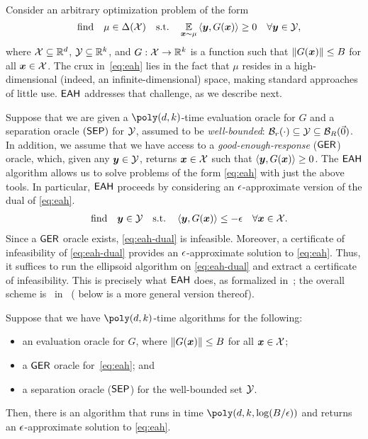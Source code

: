 Consider an arbitrary optimization problem of the form
\begin{equation}
    \label{eq:eah}
    \qq{find} \mu \in \Delta(\cX) \qq{s.t.} \E_{\vx \sim \mu} \ip{\vy, G(\vx)} \ge 0 \quad \forall \vy \in \cY,
\end{equation}
where ${\mathcal{X}} \subseteq \mathbb R^d$, ${\mathcal{Y}} \subseteq \mathbb R^k$, and $G : {\mathcal{X}} \to \mathbb R^k$ is a function such that $\| G({\bm{x}}) \| \leq B$ for all ${\bm{x}} \in {\mathcal{X}}$. The crux in~\eqref{eq:eah} lies in the fact that $\mu$ resides in a high-dimensional (indeed, an infinite-dimensional) space, making standard approaches of little use. $\textsf{EAH}$ addresses that challenge, as we describe next.

Suppose that we are given a $\poly(d, k)$-time evaluation oracle for $G$ and a separation oracle $(\textsf{SEP})$ for ${\mathcal{Y}}$, assumed to be \emph{well-bounded}: ${\mathcal{B}}_r(\cdot) \subseteq {\mathcal{Y}} \subseteq {\mathcal{B}}_R(\vec{0})$. In addition, we assume that we have access to a {\em good-enough-response} ($\textsf{GER}$) oracle, which, given any ${\bm{y}} \in {\mathcal{Y}}$, returns ${\bm{x}} \in {\mathcal{X}}$ such that $\ip{\vy, G(\vx)} \ge 0$. The $\textsf{EAH}$ algorithm allows us to solve problems of the form \eqref{eq:eah} with just the above tools. In particular, $\textsf{EAH}$ proceeds by considering an $\epsilon$-approximate version of the dual of \eqref{eq:eah}.
\begin{align} \label{eq:eah-dual}
    \qq{find} \vy \in \cY \qq{s.t.} \ip{\vy, G(\vx)} \le -\eps \quad \forall \vx \in \cX.
\end{align}
Since a $\textsf{GER}$ oracle exists, \eqref{eq:eah-dual} is infeasible. Moreover, a certificate of infeasibility of \eqref{eq:eah-dual} provides an $\epsilon$-approximate solution to \eqref{eq:eah}. Thus, it suffices to run the ellipsoid algorithm on \eqref{eq:eah-dual} and extract a certificate of infeasibility. This is precisely what $\textsf{EAH}$ does, as formalized in~; the overall scheme is~ in~ ( below is a more general version thereof).

\begin{theorem}
    \label{theorem:eah}
    Suppose that we have $\poly(d, k)$-time algorithms for the following:
    \begin{itemize}[noitemsep,topsep=0pt]
        \item an evaluation oracle for $G$, where $\| G({\bm{x}}) \| \leq B$ for all ${\bm{x}} \in {\mathcal{X}}$; 
        \item a $\textsf{GER}$ oracle for~\eqref{eq:eah}; and
        \item a separation oracle ($\textsf{SEP}$) for the well-bounded set ${\mathcal{Y}}$.
    \end{itemize}
    Then, there is an algorithm that runs in time $\poly(d, k, \log(B/\eps))$ and returns an $\epsilon$-approximate solution to \eqref{eq:eah}.
\end{theorem}

